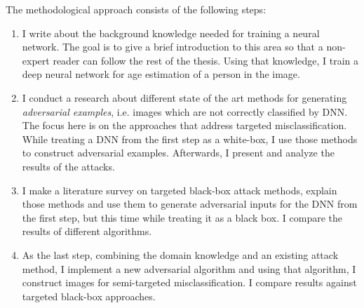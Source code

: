 The methodological approach consists of the following steps:
\begin{enumerate}
    \item I write about the background knowledge needed for training a neural network. The goal is to give a brief introduction to this area so that a non-expert reader can follow the rest of the thesis. Using that knowledge, I train a deep neural network for age estimation of a person in the image.
    
    \item I conduct a research about different state of the art methods for generating \textit{adversarial examples}, i.e. images which are not correctly classified by DNN. The focus here is on the approaches that address targeted misclassification. While treating a DNN from the first step as a white-box, I use those methods to construct adversarial examples. Afterwards, I present and analyze the results of the attacks.
    
    \item I make a literature survey on targeted black-box attack methods, explain those methods and use them to generate adversarial inputs for the DNN from the first step, but this time while treating it as a black box. I compare the results of different algorithms.
    
    \item As the last step, combining the domain knowledge and an existing attack method, I implement a new adversarial algorithm and using that algorithm, I construct images for semi-targeted misclassification. I compare results against targeted black-box approaches.
\end{enumerate}
